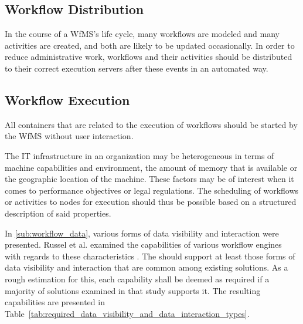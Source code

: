 
\subsection*{Workflow Distribution} %
  \label{ssub:workflow_distribution}
    In the course of a \ac{WfMS}'s life cycle, many workflows are modeled and many activities are created, and both are likely to be updated occasionally. In order to reduce administrative work, workflows and their activities should be distributed to their correct execution servers after these events in an automated way.


\subsection*{Workflow Execution} %
  \label{ssub:workflow_execution}
      All containers that are related to the execution of workflows should be started by the \ac{WfMS} without user interaction.

      The IT infrastructure in an organization may be heterogeneous in terms of machine capabilities and environment, \eg the amount of memory that is available or the geographic location of the machine. These factors may be of interest when it comes to performance objectives or legal regulations. The scheduling of workflows or activities to nodes for execution should thus be possible based on a structured description of said properties.

      In \ref{sub:workflow_data}, various forms of data visibility and interaction were presented. Russel et al. examined the capabilities of various workflow engines with regards to these characteristics \cite{Russell2005Workflow}. The should support at least those forms of data visibility and interaction that are common among existing solutions. As a rough estimation for this, each capability shall be deemed as required if a majority of solutions examined in that study supports it. The resulting capabilities are presented in Table~\ref{tab:required_data_visibility_and_data_interaction_types}.

